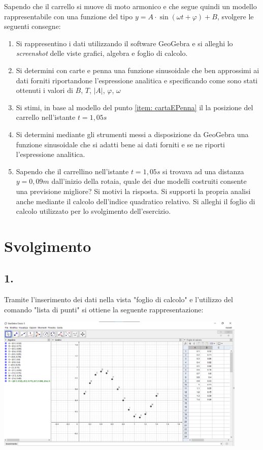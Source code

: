 \documentclass{article}     %
\begin{document}
    Sapendo che il carrello si muove di moto armonico e che segue quindi un modello rappresentabile con una funzione del tipo $y=A\cdot \sin(\omega t + \varphi)+B$, svolgere le seguenti consegne:
    \begin{enumerate}
        \item Si rappresentino i dati utilizzando il software GeoGebra e si alleghi lo \textit{screenshot} delle viste grafici, algebra e foglio di calcolo.
        \item Si determini con carte e penna una funzione sinusoidale che ben approssimi ai dati forniti riportandone l'espressione analitica e specificando come sono stati ottenuti i valori di $B$, $T$, $|A|$, $\varphi$, $\omega$ \label{item: cartaEPenna}
        \item Si stimi, in base al modello del punto \ref{item: cartaEPenna} il la posizione del carrello nell'istante $t=1,05 s$
        \item Si determini mediante gli strumenti messi a disposizione da GeoGebra una funzione sinusoidale che si adatti bene ai dati forniti e se ne riporti l'espressione analitica.
        \item Sapendo che il carrellino nell'istante $t=1,05 s$ si trovava ad una distanza $y= 0,09 m$ dall'inizio della rotaia, quale dei due modelli costruiti consente una previsione migliore? Si motivi la risposta. Si supporti la propria analisi anche mediante il calcolo dell'indice quadratico relativo. Si alleghi il foglio di calcolo utilizzato per lo svolgimento dell'esercizio. 
    \end{enumerate}
    
\section*{Svolgimento}
\subsection*{1.}
    Tramite l'inserimento dei dati nella vista "foglio di calcolo" e l'utilizzo del comando "lista di punti" si ottiene la seguente rappresentazione:
    
    \includegraphics[width = 0.9\textwidth]{1.png}
\end{document}
